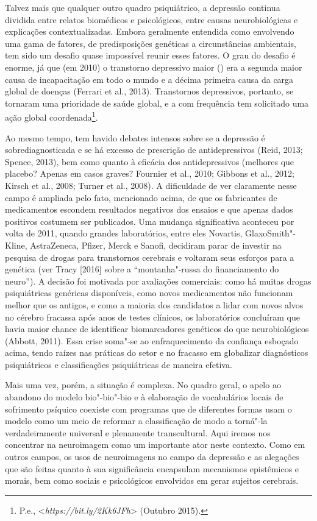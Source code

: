 Talvez mais que qualquer outro quadro psiquiátrico, a depressão continua
dividida entre relatos biomédicos e psicológicos, entre causas
neurobiológicas e explicações contextualizadas. Embora geralmente
entendida como envolvendo uma gama de fatores, de predisposições
genéticas a circunstâncias ambientais, tem sido um desafio quase
impossível reunir esses fatores. O grau do desafio é enorme, já que (em
2010) o transtorno depressivo maior () era a segunda maior causa de
incapacitação em todo o mundo e a décima primeira causa da carga global
de doenças (Ferrari et al., 2013). Transtornos depressivos, portanto, se
tornaram uma prioridade de saúde global, e a  com frequência tem
solicitado uma ação global coordenada\footnote[2]{P.e., \textless{}\emph{https://bit.ly/2Kk6JFh}\textgreater{} (Outubro
2015).}.

Ao mesmo tempo, tem havido debates intensos sobre se a depressão é
sobrediagnosticada e se há excesso de prescrição de antidepressivos
(Reid, 2013; Spence, 2013), bem como quanto à eficácia dos
antidepressivos (melhores que placebo? Apenas em casos graves? Fournier
et al., 2010; Gibbons et al., 2012; Kirsch et al., 2008; Turner et al.,
2008). A dificuldade de ver claramente nesse campo é ampliada pelo fato,
mencionado acima, de que os fabricantes de medicamentos escondem
resultados negativos dos ensaios e que apenas dados positivos costumem
ser publicados. Uma mudança significativa aconteceu por volta de 2011,
quando grandes laboratórios, entre eles Novartis, GlaxoSmith"-Kline,
AstraZeneca, Pfizer, Merck e Sanofi, decidiram parar de investir na
pesquisa de drogas para transtornos cerebrais e voltaram seus esforços
para a genética (ver Tracy {[}2016{]} sobre a ``montanha"-russa do
financiamento do neuro''). A decisão foi motivada por avaliações
comerciais: como há muitas drogas psiquiátricas genéricas disponíveis,
como novos medicamentos não funcionam melhor que os antigos, e como a
maioria dos candidatos a lidar com novos alvos no cérebro fracassa após
anos de testes clínicos, os laboratórios concluíram que havia maior
chance de identificar biomarcadores genéticos do que neurobiológicos
(Abbott, 2011). Essa crise soma"-se ao enfraquecimento da confiança
esboçado acima, tendo raízes nas práticas do setor e no fracasso em
globalizar diagnósticos psiquiátricos e classificações psiquiátricas de
maneira efetiva.

Mais uma vez, porém, a situação é complexa. No quadro geral, o apelo ao
abandono do modelo bio"-bio"-bio e à elaboração de vocabulários locais de
sofrimento psíquico coexiste com programas que de diferentes formas usam
o modelo como um meio de reformar a classificação de modo a torná"-la
verdadeiramente universal e plenamente transcultural. Aqui iremos nos
concentrar na neuroimagem como um importante ator neste contexto. Como
em outros campos, os usos de neuroimagens no campo da depressão e as
alegações que são feitas quanto à sua significância encapsulam
mecanismos epistêmicos e morais, bem como sociais e psicológicos
envolvidos em gerar sujeitos cerebrais.


